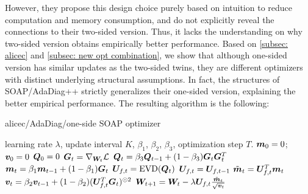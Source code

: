 However, they propose this design choice purely based on intuition to reduce computation and memory consumption, and do not explicitly reveal the connections to their two-sided version. Thus, it lacks the understanding on why two-sided version obtains empirically better performance. 
Based on \cref{subsec: alicec} and \cref{subsec: new opt combination},  we show that although one-sided version has similar updates as the two-sided twins, they are different optimizers with distinct underlying structural assumptions. In fact, the structures of SOAP/AdaDiag++ strictly generalizes their one-sided version, explaining the better empirical performance. 
The resulting algorithm is the following:
\begin{algorithm}
    \caption{\gls{alicec}/AdaDiag/one-side SOAP optimizer}
    \label{alg: alicec optimizer}
    \begin{algorithmic}
         learning rate $\lambda$, update interval $K$, $\beta_1$, $\beta_2$, $\beta_3$, optimization step $T$.
        \STATE ${\bm{m}}_0 = 0$; ${\bm{v}}_0=0$ 
        \STATE ${\bm{Q}}_0=0$ 
            \STATE ${\bm{G}}_t=\nabla_{{\bm{W}}_t}\mathcal{L}$
            \STATE ${\bm{Q}}_t = \beta_3 {\bm{Q}}_{t-1} + (1-\beta_3){\bm{G}}_t{\bm{G}}_t^T$ 
            \STATE ${\bm{m}}_t = \beta_1{\bm{m}}_{t-1}+(1-\beta_1){\bm{G}}_t$ 
                \STATE ${\bm{U}}_{f,t} = \operatorname{EVD}({\bm{Q}}_t)$ 
            \ELSE
                \STATE ${\bm{U}}_{f,t} = {\bm{U}}_{f,t-1}$
            \ENDIF
            \STATE $\tilde{{\bm{m}}}_t = {\bm{U}}_{f,t}^T{\bm{m}}_t$ 
            \STATE ${\bm{v}}_t = \beta_2{\bm{v}}_{t-1}+(1-\beta_2)({\bm{U}}_{f,t}^T{\bm{G}}_t)^{\odot 2}$ 
            \STATE ${\bm{W}}_{t+1}={\bm{W}}_t -\lambda {\bm{U}}_{f,t}\frac{\tilde{{\bm{m}}}_t}{\sqrt{{\bm{v}}_t}}$
        \ENDFOR
    \end{algorithmic}
\end{algorithm}


